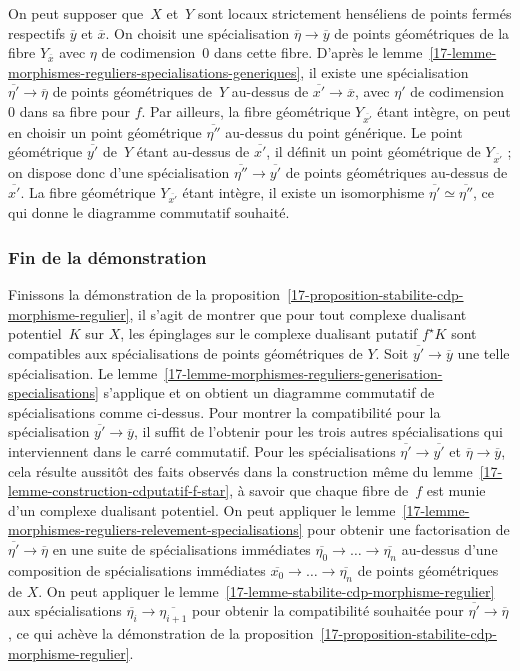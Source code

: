 \documentclass[10pt]{../fichiers-configuration-latex/smfart}
\begin{document}
On peut supposer que $X$ et $Y$ sont locaux strictement henséliens de
points fermés respectifs $\overline y$ et $\overline x$. On choisit une
spécialisation $\overline\eta\to \overline y$ de points géométriques de la
fibre $Y_{\overline x}$ avec $\eta$ de codimension $0$ dans cette fibre.
D'après le
lemme~\ref{17-lemme-morphismes-reguliers-specialisations-generiques}, il
existe une spécialisation $\overline {\eta'}\to\overline \eta$ de points
géométriques de $Y$ au-dessus de $\overline{x'}\to\overline x$, avec
$\eta'$ de codimension $0$ dans sa fibre pour $f$. Par ailleurs, la fibre
géométrique
$Y_{\overline{x'}}$ étant intègre, on peut en choisir un point géométrique
$\overline{\eta''}$ au-dessus du point générique.
Le point géométrique $\overline{y'}$ de $Y$ étant au-dessus de
$\overline{x'}$, il définit un point géométrique de $Y_{\overline{x'}}$ ;
on dispose donc d'une spécialisation $\overline{\eta''}\to\overline{y'}$ de
points géométriques au-dessus de $\overline{x'}$.
La fibre géométrique $Y_{\overline{x'}}$ étant intègre, il existe un
isomorphisme $\overline{\eta'}\simeq\overline{\eta''}$, ce qui donne le
diagramme commutatif souhaité.

\subsubsection{Fin de la démonstration}%

Finissons la démonstration de la
proposition~\ref{17-proposition-stabilite-cdp-morphisme-regulier}, il s'agit
de montrer que pour tout complexe dualisant potentiel $K$ sur $X$, les
épinglages sur le complexe dualisant putatif $f^\star K$ sont compatibles
aux spécialisations de points géométriques de $Y$. Soit
$\overline{y'}\to\overline y$ une telle spécialisation. Le
lemme~\ref{17-lemme-morphismes-reguliers-generisation-specialisations}
s'applique et on
obtient un diagramme commutatif de spécialisations comme ci-dessus. Pour
montrer la compatibilité pour la spécialisation $\overline{y'}\to\overline
y$, il suffit de l'obtenir pour les trois autres spécialisations qui
interviennent dans le carré commutatif. Pour les spécialisations
$\overline{\eta'}\to\overline{y'}$ et $\overline{\eta}\to\overline{y}$,
cela résulte aussitôt des faits observés dans 
la construction même du lemme~\ref{17-lemme-construction-cdputatif-f-star}, à
savoir que chaque fibre de $f$ est munie d'un complexe dualisant potentiel.
On peut appliquer le
lemme~\ref{17-lemme-morphismes-reguliers-relevement-specialisations}
pour obtenir une
factorisation de $\overline{\eta'}\to\overline\eta$ en une suite de
spécialisations immédiates $\overline{\eta_0}\to\dots\to\overline{\eta_n}$
au-dessus d'une composition de spécialisations immédiates
$\overline{x_0}\to\dots\to\overline{\eta_n}$ de points géométriques de $X$.
On peut appliquer le lemme~\ref{17-lemme-stabilite-cdp-morphisme-regulier} aux
spécialisations $\overline{\eta_i}\to\overline{\eta_{i+1}}$ pour obtenir la
compatibilité souhaitée pour $\overline{\eta'}\to\overline\eta$, ce qui
achève la démonstration de la
proposition~\ref{17-proposition-stabilite-cdp-morphisme-regulier}.
\end{document}
